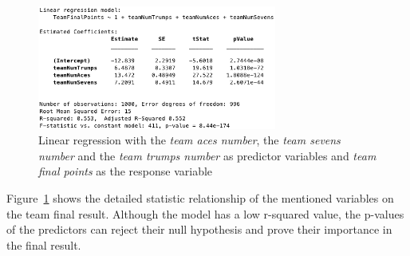 \begin{figure}[h!]
  \centering
    \includegraphics[width=0.7\textwidth]{./img/5/linearRegression}
  \caption{Linear regression with the \emph{team aces number}, the \emph{team sevens number} and the \emph{team trumps number} as predictor variables and \emph{team final points} as the response variable}
\label{fig:linearRegression}
\end{figure}

Figure~\ref{fig:linearRegression} shows the detailed statistic relationship of the mentioned variables on the team final result.
Although the model has a low r-squared value, the p-values of the predictors can reject their null hypothesis and prove their importance in the final result.

